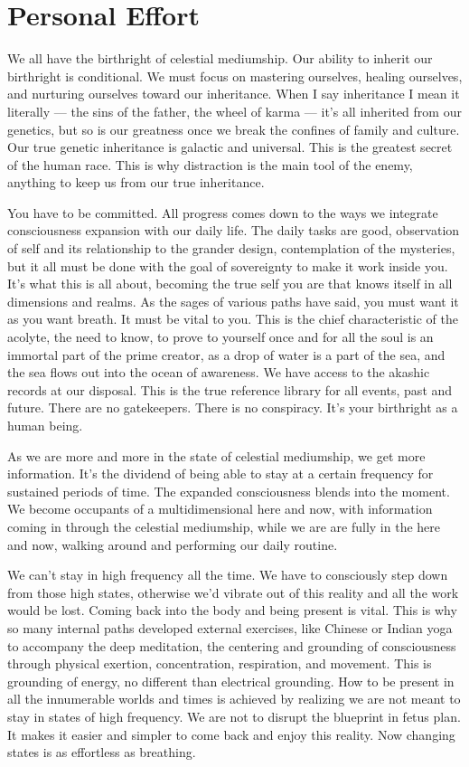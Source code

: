 \documentclass[letterpaper,9pt,twoside,titlepage,onecolumn,openany]{book}
\begin{document}
\section*{Personal Effort}\label{personal-effort}

We all have the birthright of celestial mediumship. Our ability to
inherit our birthright is conditional. We must focus on mastering
ourselves, healing ourselves, and nurturing ourselves toward our
inheritance. When I say inheritance I mean it literally --- the sins of
the father, the wheel of karma --- it's all inherited from our genetics,
but so is our greatness once we break the confines of family and
culture. Our true genetic inheritance is galactic and universal. This is
the greatest secret of the human race. This is why distraction is the
main tool of the enemy, anything to keep us from our true inheritance.

You have to be committed. All progress comes down to the ways we
integrate consciousness expansion with our daily life. The daily tasks
are good, observation of self and its relationship to the grander
design, contemplation of the mysteries, but it all must be done with the
goal of sovereignty to make it work inside you. It's what this is all
about, becoming the true self you are that knows itself in all
dimensions and realms. As the sages of various paths have said, you must
want it as you want breath. It must be vital to you. This is the chief
characteristic of the acolyte, the need to know, to prove to yourself
once and for all the soul is an immortal part of the prime creator, as a
drop of water is a part of the sea, and the sea flows out into the ocean
of awareness. We have access to the akashic records at our disposal.
This is the true reference library for all events, past and future.
There are no gatekeepers. There is no conspiracy. It's your birthright
as a human being.

As we are more and more in the state of celestial mediumship, we get
more information. It's the dividend of being able to stay at a certain
frequency for sustained periods of time. The expanded consciousness
blends into the moment. We become occupants of a multidimensional here
and now, with information coming in through the celestial mediumship,
while we are are fully in the here and now, walking around and
performing our daily routine.

We can't stay in high frequency all the time. We have to consciously
step down from those high states, otherwise we'd vibrate out of this
reality and all the work would be lost. Coming back into the body and
being present is vital. This is why so many internal paths developed
external exercises, like Chinese or Indian yoga to accompany the deep
meditation, the centering and grounding of consciousness through
physical exertion, concentration, respiration, and movement. This is
grounding of energy, no different than electrical grounding. How to be
present in all the innumerable worlds and times is achieved by realizing
we are not meant to stay in states of high frequency. We are not to
disrupt the blueprint in fetus plan. It makes it easier and simpler to
come back and enjoy this reality. Now changing states is as effortless
as breathing.
\end{document}
